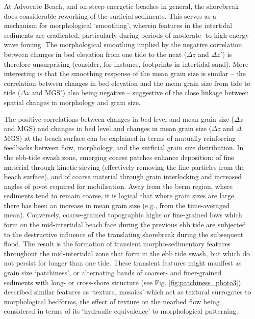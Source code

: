 \documentclass[preprint,12pt,authoryear]{elsarticle}
\begin{document}
At Advocate Beach, and on steep energetic beaches in general, the shorebreak does considerable reworking of the surficial sediments. This serves as a mechanism for morphological `smoothing', wherein features in the intertidal sediments are eradicated, particularly during periods of moderate- to high-energy wave forcing. The morphological smoothing implied by the negative correlation between changes in bed elevation from one tide to the next ($\Delta z$ and $\Delta z'$) is therefore unsurprising (consider, for instance, footprints in intertidal sand). More interesting is that the smoothing response of the mean grain size is similar -- the correlation between changes in bed elevation and the mean grain size from tide to tide ($\Delta z$ and MGS$'$) also being negative -- suggestive of the close linkage between spatial changes in morphology and grain size.


The positive correlations between changes in bed level and mean grain size ($\Delta z$ and MGS) and changes in bed level and changes in mean grain size ($\Delta z$ and $\Delta$MGS) at the beach surface can be explained in terms of mutually reinforcing feedbacks between flow, morphology, and the surficial grain size distribution. In the ebb-tide swash zone, emerging coarse patches enhance deposition: of fine material through kinetic sieving (effectively removing the fine particles from the beach surface), and of coarse material through grain interlocking and increased angles of pivot required for mobilisation. Away from the berm region, where sediments tend to remain coarse, it is logical that where grain sizes are large, there has been an increase in mean grain size (e.g., from the time-averaged mean). Conversely, coarse-grained topographic highs or fine-grained lows which form on the mid-intertidal beach face during the previous ebb tide are subjected to the destructive influence of the translating shorebreak during the subsequent flood. The result is the formation of transient morpho-sedimentary features throughout the mid-intertidal zone that form in the ebb tide swash, but which do not persist for longer than one tide. These transient features might manifest as grain size `patchiness', or alternating bands of coarser- and finer-grained sediments with long- or cross-shore structure (see Fig. \ref{fig:patchiness_photo3}). \citet{Buscombe_Masselink2006} described similar features as `textural mosaics' which act as textural surrogates to morphological bedforms, the effect of texture on the nearbed flow being considered in terms of its `hydraulic equivalence' to morphological patterning.
\end{document}
